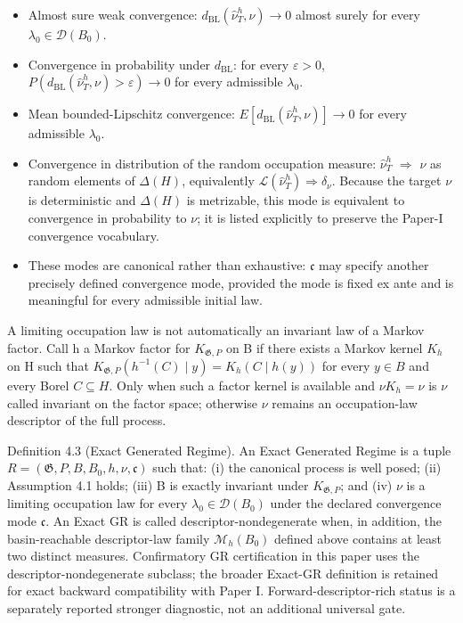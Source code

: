 \documentclass[10pt]{article}
\begin{document}
\begin{itemize}
\item
  Almost sure weak convergence:
  \(d_{\mathrm{BL}}(\widehat\nu_T^h,\nu)\to{}0\) almost surely for every
  \(\lambda_0\in{}\mathcal D(B_0)\).
\item
  Convergence in probability under \(d_{\mathrm{BL}}\): for every
  \(\varepsilon>0\),
  \(P(d_{\mathrm{BL}}(\widehat\nu_T^h,\nu)>\varepsilon)\to{}0\) for
  every admissible \(\lambda_0\).
\item
  Mean bounded-Lipschitz convergence:
  \(E[d_{\mathrm{BL}}(\widehat\nu_T^h,\nu)]\to{}0\) for every admissible
  \(\lambda_0\).
\item
  Convergence in distribution of the random occupation measure:
  \(\widehat\nu_T^h\) \(\Rightarrow{}\) \(\nu\) as random elements of
  \ensuremath{\Delta(H)}, equivalently \(\mathcal L(\widehat\nu_T^h)\Rightarrow\delta_\nu\).
  Because the target \(\nu\) is deterministic and \ensuremath{\Delta(H)} is metrizable,
  this mode is equivalent to convergence in probability to \(\nu\); it
  is listed explicitly to preserve the Paper-I convergence vocabulary.
\item
  These modes are canonical rather than exhaustive: \(\mathfrak c\) may
  specify another precisely defined convergence mode, provided the mode
  is fixed ex ante and is meaningful for every admissible initial law.
\end{itemize}

A limiting occupation law is not automatically an invariant law of a
Markov factor. Call h a Markov factor for \(K_{\mathfrak G,P}\) on B if
there exists a Markov kernel \(K_h\) on H such that
\(K_{\mathfrak G,P}(h^{-1}(C)\mid y)=K_h(C\mid h(y))\) for every
\(y\in{}B\) and every Borel \(C\subseteq{}H\). Only when such a factor
kernel is available and \(\nu{}K_h=\nu\) is \(\nu\) called invariant on
the factor space; otherwise \(\nu\) remains an occupation-law descriptor
of the full process.

Definition 4.3 (Exact Generated Regime). An Exact Generated Regime is a
tuple \(R=(\mathfrak G,P,B,B_0,h,\nu,\mathfrak c)\) such that: (i) the
canonical process is well posed; (ii) Assumption 4.1 holds; (iii) B is
exactly invariant under \(K_{\mathfrak G,P}\); and (iv) \(\nu\) is a
limiting occupation law for every \(\lambda_0\in{}\mathcal D(B_0)\) under the
declared convergence mode \(\mathfrak c\). An Exact GR is called
descriptor-nondegenerate when, in addition, the basin-reachable
descriptor-law family \(\mathcal M_h(B_0)\) defined above contains at least two
distinct measures. Confirmatory GR certification in this paper uses the
descriptor-nondegenerate subclass; the broader Exact-GR definition is
retained for exact backward compatibility with Paper I. Forward-descriptor-rich
status is a separately reported stronger diagnostic, not an additional
universal gate.
\end{document}
